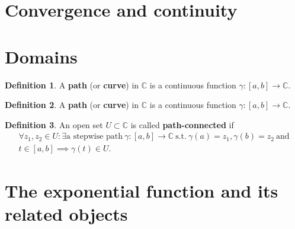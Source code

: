 \documentclass[12pt,openany]{book}
\theoremstyle{definition}
\newtheorem{definition}{Definition}
\newcommand{\C}{\mathbb{C}}
\begin{document}
	\section{Convergence and continuity}
	
	\newpage
	\section{Domains}
	\begin{tcolorbox}[title=Path; Curve; Contour;]
		\begin{definition}
			A \textbf{path} (or \textbf{curve}) in $\C$ is a continuous function $\gamma:[a,b]\to\C$.
		\end{definition}
	\end{tcolorbox}

	\begin{tcolorbox}[title=Stepwise Path;]
		\begin{definition}
			A \textbf{path} (or \textbf{curve}) in $\C$ is a continuous function $\gamma:[a,b]\to\C$.
		\end{definition}
	\end{tcolorbox}

	\begin{tcolorbox}[title=Path-connected;]
		\begin{definition}
			An open set $U\subset\C$ is called \textbf{path-connected} if \begin{align*}
			\forall z_1,z_2\in U:\exists\text{a stepwise path}\ \gamma:[a,b]\to\C\ \text{s.t.}\ \gamma(a)=z_1,\gamma(b)=z_2\ \text{and}\\
			t\in[a,b]\implies\gamma(t)\in U.
			\end{align*}
		\end{definition}
	\end{tcolorbox}

	\newpage
	\section{The exponential function and its related objects}
	
\end{document}

